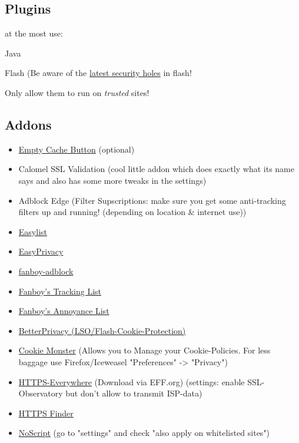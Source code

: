 \documentclass{article}
\begin{document}
\subsection{Plugins}


 at the most use: 


 Java


 Flash (Be aware of the \href{http://slashdot.org/index2.pl?fhfilter=flash}{latest security holes} in flash!


 Only allow them to run on \emph{trusted} sites!
\subsection{Addons}
  \begin{itemize}
	\item \href{https://addons.mozilla.org/en-US/firefox/addon/empty-cache-button/}{Empty Cache Button} (optional)
	\item Calomel SSL Validation (cool little addon which does exactly what its name says and also has some more tweaks in the settings)
	\item Adblock Edge (Filter Supscriptions: make sure you get some anti-tracking filters up and running! (depending on location \& internet use))
	\item \href{https://easylist.adblockplus.org/en/}{Easylist}
	\item \href{https://easylist.adblockplus.org/en/}{EasyPrivacy}
	\item \href{https://www.fanboy.co.nz/}{fanboy-adblock}
	\item \href{https://www.fanboy.co.nz/}{Fanboy's Tracking List}
	\item \href{https://www.fanboy.co.nz/}{Fanboy's Annoyance List}
	\item \href{https://addons.mozilla.org/en-US/firefox/addon/betterprivacy/}{BetterPrivacy (LSO/Flash-Cookie-Protection)}
	\item \href{https://addons.mozilla.org/en-US/firefox/addon/cookie-monster/}{Cookie Monster} (Allows you to Manage your Cookie-Policies. For less baggage use Firefox/Iceweasel "Preferences" -> "Privacy")
	\item \href{https://www.eff.org/https-everywhere}{HTTPS-Everywhere} (Download via EFF.org) (settings: enable SSL-Observatory but don't allow to transmit ISP-data)
	\item \href{https://addons.mozilla.org/en-US/firefox/addon/https-finder/}{HTTPS Finder}
	\item \href{https://addons.mozilla.org/en-US/firefox/addon/noscript}{NoScript} (go to "settings" and check "also apply on whitelisted sites")

\end{itemize}
\end{document}
